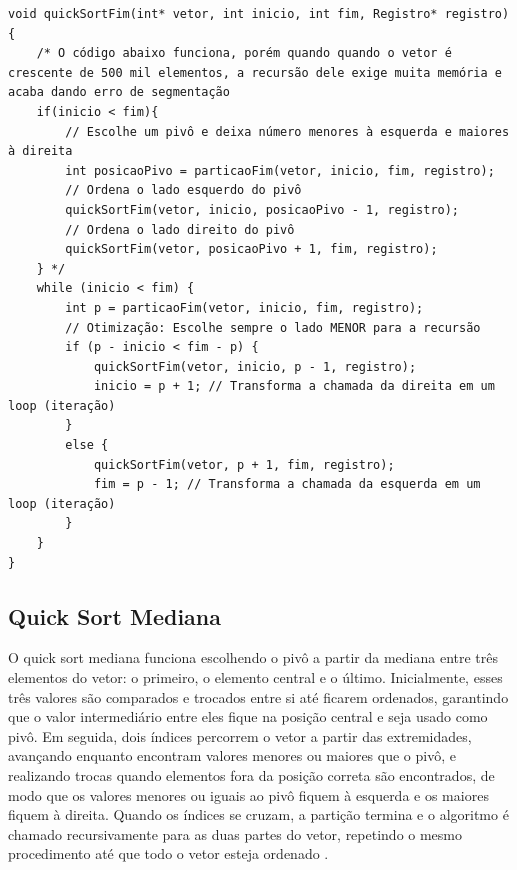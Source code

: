 \documentclass[12pt]{article}
\begin{document}
\newpage

\begin{lstlisting}
void quickSortFim(int* vetor, int inicio, int fim, Registro* registro){
    /* O código abaixo funciona, porém quando quando o vetor é crescente de 500 mil elementos, a recursão dele exige muita memória e acaba dando erro de segmentação
    if(inicio < fim){
        // Escolhe um pivô e deixa número menores à esquerda e maiores à direita
        int posicaoPivo = particaoFim(vetor, inicio, fim, registro);	
        // Ordena o lado esquerdo do pivô
        quickSortFim(vetor, inicio, posicaoPivo - 1, registro);	
        // Ordena o lado direito do pivô
        quickSortFim(vetor, posicaoPivo + 1, fim, registro);		
    } */
    while (inicio < fim) {
        int p = particaoFim(vetor, inicio, fim, registro);
        // Otimização: Escolhe sempre o lado MENOR para a recursão
        if (p - inicio < fim - p) {
            quickSortFim(vetor, inicio, p - 1, registro);
            inicio = p + 1; // Transforma a chamada da direita em um loop (iteração)
        } 
        else {
            quickSortFim(vetor, p + 1, fim, registro);
            fim = p - 1; // Transforma a chamada da esquerda em um loop (iteração)
        }
    }
}
\end{lstlisting}

\subsection{Quick Sort Mediana}

O quick sort mediana funciona escolhendo o pivô a partir da mediana entre três elementos do vetor: o primeiro, o elemento central e o último. Inicialmente, esses três valores são comparados e trocados entre si até ficarem ordenados, garantindo que o valor intermediário entre eles fique na posição central e seja usado como pivô. Em seguida, dois índices percorrem o vetor a partir das extremidades, avançando enquanto encontram valores menores ou maiores que o pivô, e realizando trocas quando elementos fora da posição correta são encontrados, de modo que os valores menores ou iguais ao pivô fiquem à esquerda e os maiores fiquem à direita. Quando os índices se cruzam, a partição termina e o algoritmo é chamado recursivamente para as duas partes do vetor, repetindo o mesmo procedimento até que todo o vetor esteja ordenado \cite{cormen2009}.
\end{document}
